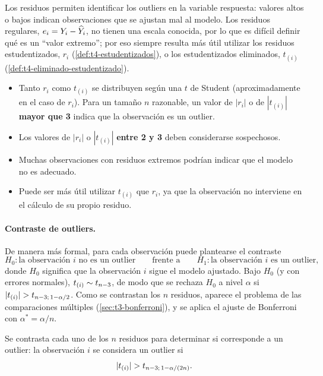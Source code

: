 Los residuos permiten identificar los outliers en la variable respuesta: valores altos o bajos
indican observaciones que se ajustan mal al modelo. Los residuos regulares, $e_i=Y_i-\widehat{Y}_i$,
no tienen una escala conocida, por lo que es difícil definir qué es un ``valor extremo''; por
eso siempre resulta más útil utilizar los residuos estudentizados, $r_i$
(\cref{def:t4-estudentizados}), o los estudentizados eliminados, $t_{(i)}$
(\cref{def:t4-eliminado-estudentizado}).
\begin{itemize}
  \item Tanto $r_i$ como $t_{(i)}$ se distribuyen según una $t$ de Student (aproximadamente en el
    caso de $r_i$). Para un tamaño $n$ razonable, un valor de $|r_i|$ o de $|t_{(i)}|$
    \textbf{mayor que 3} indica que la observación es un outlier.
  \item Los valores de $|r_i|$ o $|t_{(i)}|$ \textbf{entre 2 y 3} deben considerarse
    sospechosos.
  \item Muchas observaciones con residuos extremos podrían indicar que el modelo no es adecuado.
  \item Puede ser más útil utilizar $t_{(i)}$ que $r_i$, ya que la observación no interviene en
    el cálculo de su propio residuo.
\end{itemize}

\paragraph{Contraste de outliers.} De manera más formal, para cada observación puede plantearse
el contraste
\[
  H_0\colon \text{la observación } i \text{ no es un outlier}
  \qquad\text{frente a}\qquad
  H_1\colon \text{la observación } i \text{ es un outlier},
\]
donde $H_0$ significa que la observación $i$ sigue el modelo ajustado. Bajo $H_0$ (y con errores
normales), $t_{(i)}\sim t_{n-3}$, de modo que se rechaza $H_0$ a nivel $\alpha$ si
$|t_{(i)}|>\tq{n-3}{1-\alpha/2}$. Como se contrastan los $n$ residuos, aparece el problema de las
comparaciones múltiples (\cref{sec:t3-bonferroni}), y se aplica el ajuste de Bonferroni con
$\alpha^*=\alpha/n$.

\begin{resumen}
  Se contrasta cada uno de los $n$ residuos para determinar si corresponde a un outlier: la
  observación $i$ se considera un outlier si
  \[
    |t_{(i)}| > t_{n-3;\,1-\alpha/(2n)} .
  \]
\end{resumen}

